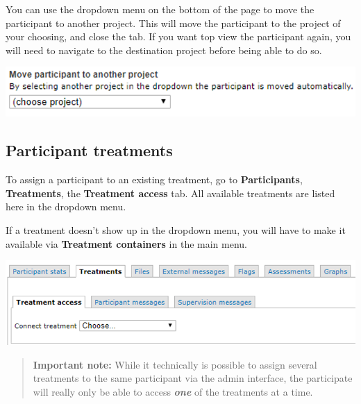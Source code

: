 \documentclass[]{book}
\begin{document}
You can use the dropdown menu on the bottom of the page to move the participant to another project. This will move the participant to the project of your choosing, and close the tab. If you want top view the participant again, you will need to navigate to the destination project before being able to do so.

\includegraphics{images/new-images/participantMoveProject.png}

\hypertarget{participant-treatments}{%
\subsection{Participant treatments}\label{participant-treatments}}

To assign a participant to an existing treatment, go to \textbf{Participants}, \textbf{Treatments}, the \textbf{Treatment access} tab. All available treatments are listed here in the dropdown menu.

If a treatment doesn't show up in the dropdown menu, you will have to make it available via \textbf{Treatment containers} in the main menu.

\includegraphics{images/new-images/participantTreatConnect.png}

\begin{quote}
\textbf{Important note:} While it technically is possible to assign several treatments to the same participant via the admin interface, the participate will really only be able to access \emph{\textbf{one}} of the treatments at a time.
\end{quote}
\end{document}
